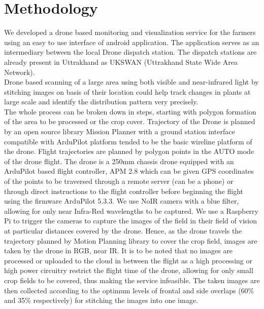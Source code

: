 \chapter{Methodology}
We developed a drone based monitoring and visualization service for the farmers using an easy to use interface of android application. The application serves as an intermediary between the local Drone dispatch station. The dispatch stations are already present in Uttrakhand as UKSWAN (Uttrakhand State Wide Area Network).\\ 
Drone based scanning of a large area using both visible and near-infrared light by stitching images on basis of their location could help track changes in plants at large scale and identify the distribution pattern very precisely.\\
The whole process can be broken down in steps, starting with polygon formation of the area to be processed or the crop cover. Trajectory of the Drone is planned by an open source library Mission Planner with a ground station interface compatible with ArduPilot platform tended to be the basic wireline platform of the drone. Flight trajectories are planned by polygon points in the AUTO mode of the drone flight. The drone is a 250mm chassis drone equipped with an  ArduPilot based flight controller, APM 2.8 which can be given GPS coordinates of the points to be traversed through a remote server (can be a phone) or through direct instructions to the flight controller before beginning the flight using the firmware ArduPilot 5.3.3. We use NoIR camera with a  blue filter, allowing for only near Infra-Red wavelengths to be captured. We use a Raspberry Pi to trigger the cameras to capture the images of the field in their field of vision at particular distances covered by the drone. Hence, as the drone travels the trajectory planned by Motion Planning library to cover the crop field, images are taken by the drone in RGB, near IR. It is to be noted that no images are processed or uploaded to the cloud in between the flight as a high processing or high power circuitry restrict the flight time of the drone, allowing for only small crop fields to be covered, thus making the service infeasible.
The taken images are then collected according to the optimum levels of frontal and side overlaps (60\% and 35\% respectively) for stitching the images into one image.\\
